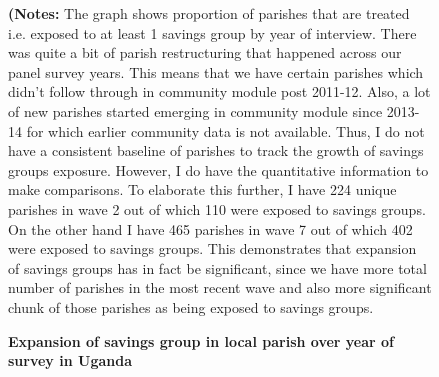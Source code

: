 \documentclass[12pt]{article}
\begin{document}
{\graphicspath{{Images/}}
\begin{figure}[ht]
\caption{\textbf{Expansion of savings group in local parish over year of survey in Uganda}}
\label{fig:fig1}
\footnotesize{\textbf{(Notes: }The graph shows proportion of parishes that are treated i.e. exposed to at least 1 savings group by year of interview. There was quite a bit of parish restructuring that happened across our panel survey years. This means that we have certain parishes which didn't follow through in community module post 2011-12. Also, a lot of new parishes started emerging in community module since 2013-14 for which earlier community data is not available. Thus, I do not have a consistent baseline of parishes to track the growth of savings groups exposure. However, I do have the quantitative information to make comparisons. To elaborate this further, I have 224 unique parishes in wave 2 out of which 110 were exposed to savings groups. On the other hand I have 465 parishes in wave 7 out of which 402 were exposed to savings groups. This demonstrates that expansion of savings groups has in fact be significant, since we have more total number of parishes in the most recent wave and also more significant chunk of those parishes as being exposed to savings groups.}
\end{figure}
\clearpage



}
\end{document}
